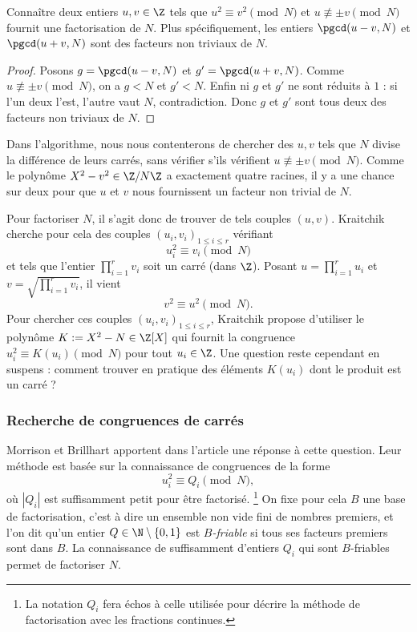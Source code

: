 \begin{lemme}
	Connaître deux entiers $u, v \in \Z$ tels que $u^2 \equiv v^2 
	\pmod{N}$ et $u\not\equiv \pm v\pmod{N}$ fournit une factorisation de $N$.
	Plus spécifiquement, les entiers $\pgcd(u-v, N)$ et $\pgcd(u+v, N)$ sont
	des facteurs non triviaux de $N$.
\end{lemme}

\begin{proof}
	Posons $g =\pgcd(u-v, N)$ et $g' = \pgcd(u+v, N)$. Comme $u\not\equiv \pm
	v\pmod{N}$, on a $g<N$ et $g'<N$. Enfin ni $g$ et $g'$ ne sont réduits à
	$1$ : si l'un deux l'est, l'autre vaut $N$, contradiction. Donc $g$ et $g'$
	sont tous deux des facteurs non triviaux de $N$.
\end{proof}

\begin{remarque}
	Dans l'algorithme, nous nous contenterons de chercher des $u, v$ tels que
	$N$ divise la différence de leurs carrés, sans vérifier s'ils vérifient $u
	\not\equiv \pm v\pmod{N}$. Comme le polynôme $X^2 - v^2 \in \Z/N\Z$ a
    exactement quatre racines, il y a \og{} une chance sur deux \fg{}  pour que
	$u$ et $v$ nous fournissent un facteur non trivial de $N$. \\
\end{remarque}

Pour factoriser $N$, il s'agit donc de trouver de tels couples $(u, v)$.
Kraitchik cherche pour cela des couples $(u_i, v_i)_{1\leq i \leq r}$ vérifiant
\[u_i^2 \equiv v_i \pmod{N}\] et tels que l'entier $\prod_{i=1}^r v_i$ soit un
carré (dans $\Z$). Posant $u = \prod_{i=1}^r u_i$ et $v = \sqrt{\prod_{i=1}^r
v_i}$, il vient \[v^2\equiv u^2 \pmod{N}.\] Pour chercher ces couples $(u_i, v_i)
_{1\leq i \leq r}$, Kraitchik propose d'utiliser le polynôme  $K := X^2 - N \in
\Z[X]$ qui fournit la congruence $u_i^2 \equiv K(u_i) \pmod{N}$ pour tout $u_i
\in \Z$. Une question reste cependant en suspens : comment trouver en pratique 
des éléments $K(u_i)$ dont le produit est un carré ?

\subsubsection{Recherche de congruences de carrés}

Morrison et Brillhart apportent dans l'article  une réponse à cette
question. Leur méthode est basée sur la connaissance de congruences de la forme
\[u_i^2 \equiv Q_i \pmod{N},\] où $| Q_i |$ est suffisamment petit pour être 
factorisé. \footnote{La notation $Q_i$ fera échos à celle utilisée pour décrire
la méthode de factorisation avec les fractions continues.} 
On fixe pour cela $B$ une base de factorisation, c'est à dire un ensemble non 
vide fini de nombres premiers, et l'on dit qu'un entier $Q\in \N\setminus
\{0, 1\}$ est \emph{$B$-friable} si tous ses facteurs premiers sont dans $B$.
La connaissance de suffisamment d'entiers $Q_i$ qui sont $B$-friables permet
de factoriser $N$.

